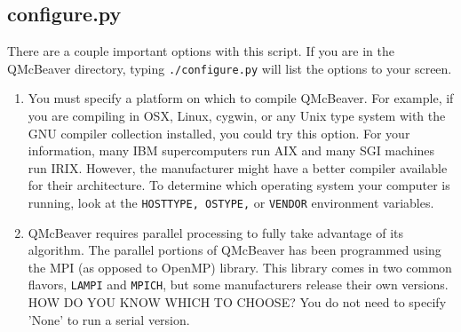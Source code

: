 \documentclass[11pt]{article}
\begin{document}
\subsection{configure.py}
There are a couple important options with this script. If you are in the QMcBeaver directory, typing {\tt./configure.py} will list the options to your screen.
\begin{enumerate}
\item You must specify a platform on which to compile QMcBeaver. For example, if you are compiling in OSX, Linux, cygwin, or any Unix type system with the GNU compiler collection installed, you could try this option. For your information, many IBM supercomputers run AIX and many SGI machines run IRIX. However, the manufacturer might have a better compiler available for their architecture. To determine which operating system your computer is running, look at the {\tt HOSTTYPE, OSTYPE,} or {\tt VENDOR} environment variables.

\item QMcBeaver requires parallel processing to fully take advantage of its algorithm. The parallel portions of QMcBeaver has been programmed using the MPI (as opposed to OpenMP) library. This library comes in two common flavors, {\tt LAMPI} and {\tt MPICH}, but some manufacturers release their own versions. HOW DO YOU KNOW WHICH TO CHOOSE? You do not need to specify 'None' to run a serial version.


\end{enumerate}
\end{document}
